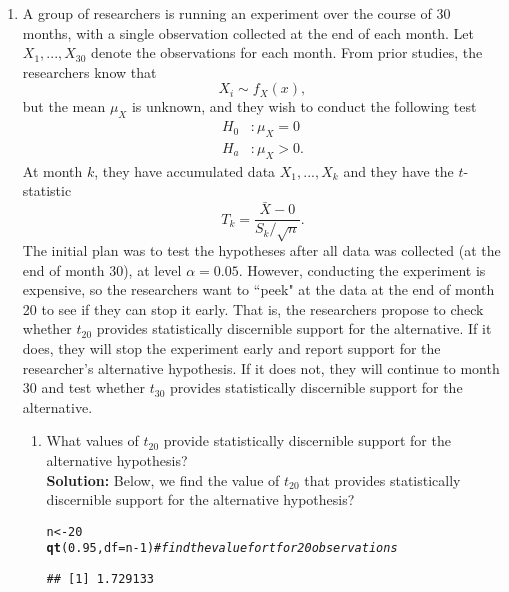 \documentclass{article}\usepackage[]{graphicx}\usepackage[]{xcolor}
\makeatletter
\newcommand{\hlnum}[1]{\textcolor[rgb]{0.686,0.059,0.569}{#1}}%
\newcommand{\hlcom}[1]{\textcolor[rgb]{0.678,0.584,0.686}{\textit{#1}}}%
\newcommand{\hlopt}[1]{\textcolor[rgb]{0,0,0}{#1}}%
\newcommand{\hldef}[1]{\textcolor[rgb]{0.345,0.345,0.345}{#1}}%
\newcommand{\hlkwb}[1]{\textcolor[rgb]{0.69,0.353,0.396}{#1}}%
\newcommand{\hlkwc}[1]{\textcolor[rgb]{0.333,0.667,0.333}{#1}}%
\newcommand{\hlkwd}[1]{\textcolor[rgb]{0.737,0.353,0.396}{\textbf{#1}}}%
\newenvironment{kframe}{%
 \def\at@end@of@kframe{}%
 \ifinner\ifhmode%
  \def\at@end@of@kframe{\end{minipage}}%
  \begin{minipage}{\columnwidth}%
 \fi\fi%
 \def\FrameCommand##1{\hskip\@totalleftmargin \hskip-\fboxsep
 \colorbox{shadecolor}{##1}\hskip-\fboxsep
     \hskip-\linewidth \hskip-\@totalleftmargin \hskip\columnwidth}%
 \MakeFramed {\advance\hsize-\width
   \@totalleftmargin\z@ \linewidth\hsize
   \@setminipage}}%
 {\par\unskip\endMakeFramed%
 \at@end@of@kframe}
\newenvironment{knitrout}{}{} %
\makeatother
\begin{document}
\begin{enumerate}
\item A group of researchers is running an experiment over the course of 30 months, 
with a single observation collected at the end of each month. Let $X_1, ..., X_{30}$
denote the observations for each month. From prior studies, the researchers know that
\[X_i \sim f_X(x),\]
but the mean $\mu_X$ is unknown, and they wish to conduct the following test
\begin{align*}
H_0&: \mu_X = 0\\
H_a&: \mu_X > 0.
\end{align*}
At month $k$, they have accumulated data $X_1, ..., X_k$ and they have the 
$t$-statistic
\[T_k = \frac{\bar{X} - 0}{S_k/\sqrt{n}}.\]
The initial plan was to test the hypotheses after all data was collected (at the 
end of month 30), at level $\alpha=0.05$. However, conducting the experiment is 
expensive, so the researchers want to ``peek" at the data at the end of month 20 
to see if they can stop it early. That is, the researchers propose to check 
whether $t_{20}$ provides statistically discernible support for the alternative. 
If it does, they will stop the experiment early and report support for the 
researcher's alternative hypothesis. If it does not, they will continue to month 
30 and test whether $t_{30}$ provides statistically discernible support for the
alternative.

\begin{enumerate}
  \item What values of $t_{20}$ provide statistically discernible support for the
  alternative hypothesis? \\
  \textbf{Solution:} Below, we find the value of $t_{20}$ that provides statistically discernible support for the
  alternative hypothesis?
\begin{knitrout}\scriptsize
{}\color{fgcolor}\begin{kframe}
\begin{alltt}
\hldef{n} \hlkwb{<-} \hlnum{20}
\hlkwd{qt}\hldef{(}\hlnum{0.95}\hldef{,} \hlkwc{df} \hldef{= n} \hlopt{-} \hlnum{1}\hldef{)} \hlcom{#find the value for t for 20 observations}
\end{alltt}
\begin{verbatim}
## [1] 1.729133
\end{verbatim}
\end{kframe}
\end{knitrout}
  

\end{enumerate}
\end{enumerate}
\end{document}
